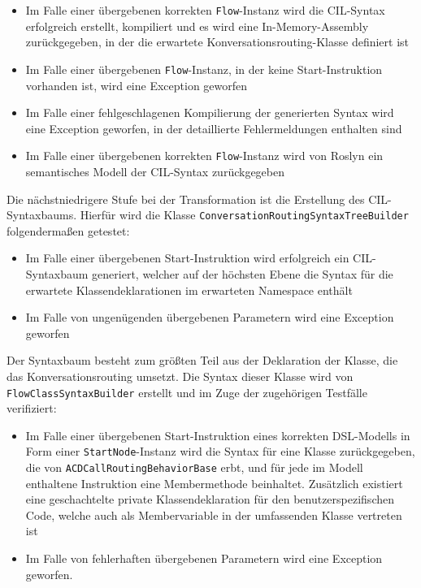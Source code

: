 \begin{itemize}
\item Im Falle einer übergebenen korrekten \texttt{Flow}-Instanz wird die CIL-Syntax erfolgreich erstellt, kompiliert und es wird eine In-Memory-Assembly zurückgegeben, in der die erwartete Konversationsrouting-Klasse definiert ist
\item Im Falle einer übergebenen \texttt{Flow}-Instanz, in der keine Start-Instruktion vorhanden ist, wird eine Exception geworfen
\item Im Falle einer fehlgeschlagenen Kompilierung der generierten Syntax wird eine Exception geworfen, in der detaillierte Fehlermeldungen enthalten sind
\item Im Falle einer übergebenen korrekten \texttt{Flow}-Instanz wird von Roslyn ein semantisches Modell der CIL-Syntax zurückgegeben
\end{itemize} 

\noindent Die nächstniedrigere Stufe bei der Transformation ist die Erstellung des CIL-Syntaxbaums. Hierfür wird die Klasse \texttt{ConversationRoutingSyntaxTreeBuilder} folgendermaßen getestet:

\begin{itemize}
\item Im Falle einer übergebenen Start-Instruktion wird erfolgreich ein CIL-Syn\-tax\-baum generiert, welcher auf der höchsten Ebene die Syntax für die erwartete Klassendeklarationen im erwarteten Namespace enthält
\item Im Falle von ungenügenden übergebenen Parametern wird eine Exception geworfen
\end{itemize}

\noindent Der Syntaxbaum besteht zum größten Teil aus der Deklaration der Klasse, die das Konversationsrouting umsetzt. Die Syntax dieser Klasse wird von \texttt{FlowClassSyntaxBuilder} erstellt und im Zuge der zugehörigen Testfälle verifiziert:

\begin{itemize}
\item Im Falle einer übergebenen Start-Instruktion eines korrekten DSL-Modells in Form einer \texttt{StartNode}-Instanz wird die Syntax für eine Klasse zurückgegeben, die von \texttt{ACDCallRoutingBehaviorBase} erbt, und für jede im Modell enthaltene Instruktion eine Membermethode beinhaltet. Zusätzlich existiert eine geschachtelte private Klassendeklaration für den benutzerspezifischen Code, welche auch als Membervariable in der umfassenden Klasse vertreten ist
\item Im Falle von fehlerhaften übergebenen Parametern wird eine Exception geworfen.
\end{itemize}

